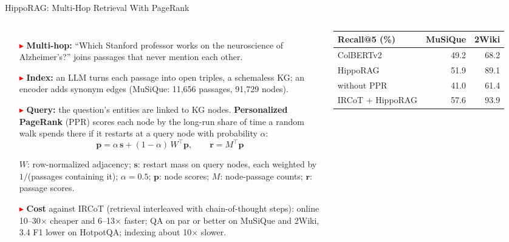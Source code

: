 \begin{frame}{HippoRAG: Multi-Hop Retrieval With PageRank}
  \begin{columns}[T,onlytextwidth]
      \begin{itemize}\footnotesize\itemsep0.3em
        \item[\textcolor{red}{$\blacktriangleright$}] \textbf{Multi-hop:} ``Which Stanford professor works on the neuroscience of Alzheimer's?'' joins passages that never mention each other.
        \item[\textcolor{red}{$\blacktriangleright$}] \textbf{Index:} an LLM turns each passage into open triples, a schemaless KG; an encoder adds synonym edges (MuSiQue: 11{,}656 passages, 91{,}729 nodes).
        \item[\textcolor{red}{$\blacktriangleright$}] \textbf{Query:} the question's entities are linked to KG nodes. \textbf{Personalized PageRank} (PPR) scores each node by the long-run share of time a random walk spends there if it restarts at a query node with probability $\alpha$:
          \[ \mathbf{p} = \alpha\,\mathbf{s} + (1-\alpha)\,W^{\top}\mathbf{p}, \qquad \mathbf{r} = M^{\top}\mathbf{p} \]
          {\scriptsize $W$: row-normalized adjacency; $\mathbf{s}$: restart mass on query nodes, each weighted by $1/$(passages containing it); $\alpha = 0.5$; $\mathbf{p}$: node scores; $M$: node-passage counts; $\mathbf{r}$: passage scores.\par}
        \item[\textcolor{red}{$\blacktriangleright$}] \textbf{Cost} against IRCoT (retrieval interleaved with chain-of-thought steps): online 10--30$\times$ cheaper and 6--13$\times$ faster; QA on par or better on MuSiQue and 2Wiki, 3.4 F1 lower on HotpotQA; indexing about 10$\times$ slower.
      \end{itemize}
      \centering
      \vspace{0.6em}
      {\footnotesize
      \begin{tabular}{@{}l r r@{}}
        \toprule
        \textbf{Recall@5 (\%)} & \textbf{MuSiQue} & \textbf{2Wiki} \\
        \midrule
        ColBERTv2 & 49.2 & 68.2 \\
        HippoRAG & 51.9 & 89.1 \\
        \quad without PPR & 41.0 & 61.4 \\
        IRCoT + HippoRAG & 57.6 & 93.9 \\
        \bottomrule
      \end{tabular}\par}

\end{columns}
\end{frame}
